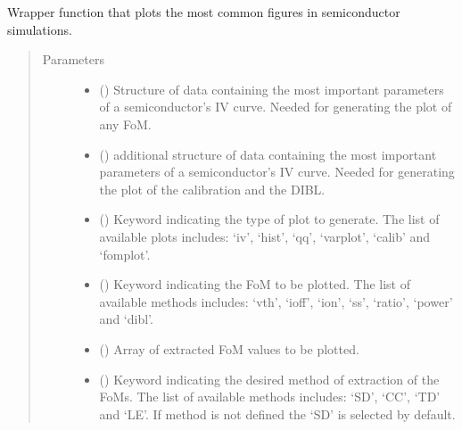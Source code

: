 \documentclass[letterpaper,10pt,english,openany, oneside]{sphinxmanual}
\begin{document}
\begin{fulllineitems}
\label{\detokenize{index:fompy.wrappers.plot}}
Wrapper function that plots the most common figures in semiconductor simulations.
\begin{quote}\begin{description}
\item[{Parameters}] \leavevmode\begin{itemize}
\item {} 
 () \textendash{} Structure of data containing the most important parameters of a semiconductor’s IV curve.
Needed for generating the plot of any FoM.

\item {} 
 () \textendash{} additional structure of data containing the most important parameters of a semiconductor’s IV curve.
Needed for generating the plot of the calibration and the DIBL.

\item {} 
 () \textendash{} Keyword indicating the type of plot to generate. The list of available plots includes:
‘iv’, ‘hist’, ‘qq’, ‘varplot’, ‘calib’ and ‘fomplot’.

\item {} 
 () \textendash{} Keyword indicating the FoM to be plotted. The list of available methods includes:
‘vth’, ‘ioff’, ‘ion’, ‘ss’, ‘ratio’, ‘power’ and ‘dibl’.

\item {} 
 () \textendash{} Array of extracted FoM values to be plotted.

\item {} 
 () \textendash{} Keyword indicating the desired method of extraction of the FoMs. The list of available methods includes:
‘SD’, ‘CC’, ‘TD’ and ‘LE’. If method is not defined the ‘SD’ is selected by default.


\end{itemize}
\end{description}
\end{quote}
\end{fulllineitems}
\end{document}
